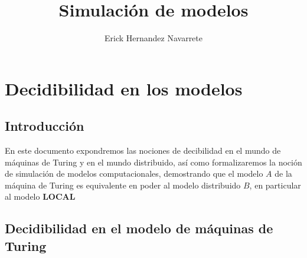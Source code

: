 \documentclass[10pt]{report}
\author{Erick Hernandez Navarrete}
\title{Simulación de modelos}
\begin{document}
    \maketitle
    \tableofcontents{}
    \chapter{Decidibilidad en los modelos}\label{ch:decidibilidad-en-los-modelos}
    \section{Introducción}\label{sec:introducción}
    En este documento expondremos las nociones de decibilidad
    en el mundo de máquinas de Turing y en el mundo distribuido,
    así como formalizaremos la noción de simulación de modelos
    computacionales, demostrando que el modelo $A$ de  la máquina de
    Turing es equivalente en poder al modelo distribuido $B$, en particular al modelo \textbf{LOCAL}

    \section{Decidibilidad en el modelo de máquinas de Turing}\label{sec:decidibilidasd-en-el-modelo-de-máquinas-de-turing}
\end{document}
